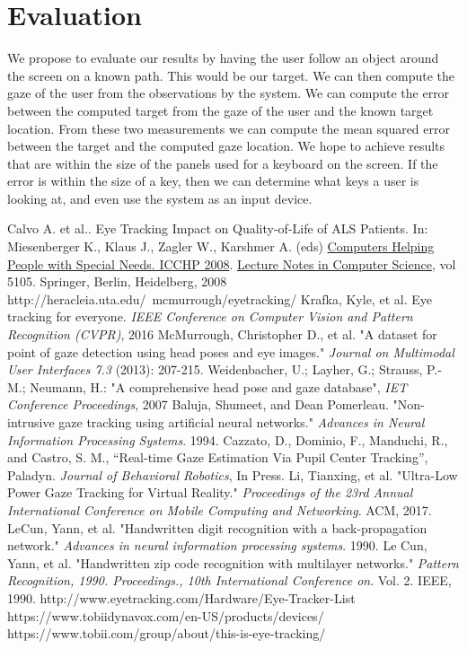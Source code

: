 \documentclass[10pt,twocolumn,letterpaper]{article}
\begin{document}
\section{Evaluation}
We propose to evaluate our results by having the user follow an object
around the screen on a known path. This would be our target. We can
then compute the gaze of the user from the observations by the
system. We can compute the error between the computed target from the
gaze of the user and the known target location. From these two
measurements we can compute the mean squared error between the target
and the computed gaze location. We hope to achieve results that are
within the size of the panels used for a keyboard on the screen. If
the error is within the size of a key, then we can determine what keys
a user is looking at, and even use the system as an input device.



{\small


\begin{thebibliography}{1}
  Calvo A. et al.. Eye Tracking Impact on Quality-of-Life of ALS
  Patients. In: Miesenberger K., Klaus J., Zagler W., Karshmer
  A. (eds) \underline{Computers Helping People with Special Needs. ICCHP
    2008}. \underline{Lecture Notes in Computer Science}, vol 5105. Springer,
  Berlin, Heidelberg, 2008
  http://heracleia.uta.edu/~mcmurrough/eyetracking/
  Krafka, Kyle, et al. Eye tracking for everyone.
  \textit{IEEE Conference on Computer Vision and Pattern Recognition
    (CVPR)}, 2016
  McMurrough, Christopher D., et al. "A dataset for point of gaze
  detection using head poses and eye images."
  \textit{Journal on Multimodal User Interfaces 7.3} (2013): 207-215.
  Weidenbacher, U.; Layher, G.; Strauss, P.-M.; Neumann, H.: "A
  comprehensive head pose and gaze database",
  \textit{IET Conference Proceedings}, 2007
  Baluja, Shumeet, and Dean Pomerleau. "Non-intrusive gaze tracking
  using artificial neural networks." \textit{Advances in Neural
    Information Processing Systems}. 1994.
  Cazzato, D., Dominio, F., Manduchi, R., and Castro, S. M.,
  “Real-time Gaze Estimation Via Pupil Center Tracking”,
  Paladyn. \textit{Journal of Behavioral Robotics}, In Press.
  Li, Tianxing, et al. "Ultra-Low Power Gaze Tracking for Virtual
  Reality." \textit{Proceedings of the 23rd Annual International
    Conference on Mobile Computing and Networking}. ACM, 2017.
  LeCun, Yann, et al. "Handwritten digit recognition with a
  back-propagation network." \textit{Advances in neural information
    processing systems}. 1990.
  Le Cun, Yann, et al. "Handwritten zip code recognition with
  multilayer networks." \textit{Pattern Recognition,
    1990. Proceedings., 10th International Conference
    on}. Vol. 2. IEEE, 1990.
  http://www.eyetracking.com/Hardware/Eye-Tracker-List
  https://www.tobiidynavox.com/en-US/products/devices/
  https://www.tobii.com/group/about/this-is-eye-tracking/

\end{thebibliography}
}
\end{document}
